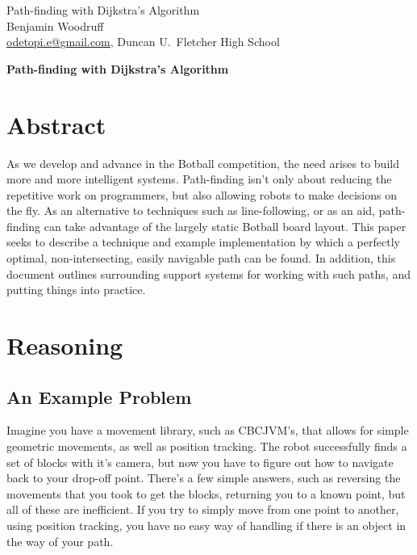 \documentclass[letterpaper, 12pt]{article}
\begin{document}
\begin{flushleft}
Path-finding with Dijkstra's Algorithm\\
Benjamin Woodruff\\
\href{mailto:odetopi.e@gmail.com}{odetopi.e@gmail.com},
Duncan U.~Fletcher High School
\end{flushleft}

\vspace{0.25in}

\begin{huge}
    \begin{center}
        \textbf{Path-finding with Dijkstra's Algorithm}
    \end{center}
\end{huge}
\vspace{.5in}

\begin{multicols}{2}

\section{Abstract}

As we develop and advance in the Botball competition, the need arises to build
more and more intelligent systems. Path-finding isn't only about reducing the
repetitive work on programmers, but also allowing robots to make decisions on
the fly. As an alternative to techniques such as line-following, or as an aid,
path-finding can take advantage of the largely static Botball board layout. This
paper seeks to describe a technique and example implementation by which a
perfectly optimal, non-intersecting, easily navigable path can be found. In
addition, this document outlines surrounding support systems for working with
such paths, and putting things into practice.

\section{Reasoning}

\subsection{An Example Problem}

Imagine you have a movement library, such as CBCJVM's, that allows for simple
geometric movements, as well as position tracking. The robot successfully finds
a set of blocks with it's camera, but now you have to figure out how to navigate
back to your drop-off point. There's a few simple answers, such as reversing the
movements that you took to get the blocks, returning you to a known point, but
all of these are inefficient. If you try to simply move from one point to
another, using position tracking, you have no easy way of handling if there is
an object in the way of your path.


\end{multicols}
\end{document}
